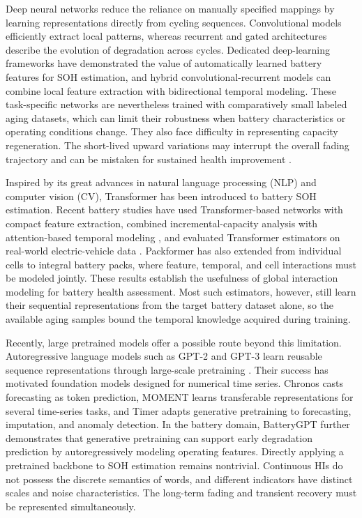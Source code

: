 \documentclass[preprint,12pt]{elsarticle}
\begin{document}
Deep neural networks reduce the reliance on manually specified mappings by learning representations directly from cycling sequences. Convolutional models efficiently extract local patterns, whereas recurrent and gated architectures describe the evolution of degradation across cycles. Dedicated deep-learning frameworks \cite{fan2020novel} have demonstrated the value of automatically learned battery features for SOH estimation, and hybrid convolutional-recurrent models \cite{mazzi2024hybrid} can combine local feature extraction with bidirectional temporal modeling. These task-specific networks are nevertheless trained with comparatively small labeled aging datasets, which can limit their robustness when battery characteristics or operating conditions change. They also face difficulty in representing capacity regeneration. The short-lived upward variations may interrupt the overall fading trajectory and can be mistaken for sustained health improvement \cite{ma2021capacity}.

Inspired by its great advances in natural language processing (NLP) and computer vision (CV), Transformer has been introduced to battery SOH estimation. Recent battery studies \cite{luo2023simple} have used Transformer-based networks with compact feature extraction, combined incremental-capacity analysis with attention-based temporal modeling \cite{xu2024incremental}, and evaluated Transformer estimators on real-world electric-vehicle data \cite{nakano2024advancing}. Packformer \cite{hu2025packformer} has also extended from individual cells to integral battery packs, where feature, temporal, and cell interactions must be modeled jointly. These results establish the usefulness of global interaction modeling for battery health assessment. Most such estimators, however, still learn their sequential representations from the target battery dataset alone, so the available aging samples bound the temporal knowledge acquired during training.

Recently,  large pretrained models offer a possible route beyond this limitation. Autoregressive language models such as GPT-2 and GPT-3 learn reusable sequence representations through large-scale pretraining \cite{radford2019language,brown2020language}. Their success has motivated foundation models designed for numerical time series. Chronos \cite{ansari2024chronos} casts forecasting as token prediction, MOMENT \cite{goswami2024moment} learns transferable representations for several time-series tasks, and Timer \cite{liu2024timer} adapts generative pretraining to forecasting, imputation, and anomaly detection. In the battery domain, BatteryGPT  \cite{hu2026batterygpt} further demonstrates that generative pretraining can support early degradation prediction by autoregressively modeling operating features. Directly applying a pretrained backbone to SOH estimation remains nontrivial. Continuous HIs do not possess the discrete semantics of words, and different indicators have distinct scales and noise characteristics. The long-term fading and transient recovery must be represented simultaneously.
\end{document}
